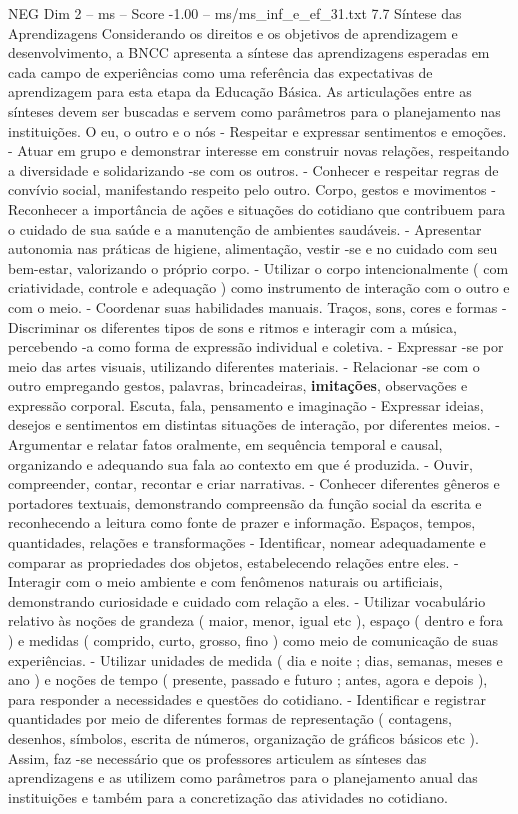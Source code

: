\begin{textsample}{NEG Dim 2 – ms – Score -1.00 – ms/ms\_inf\_e\_ef\_31.txt}  \label{ex:f2_neg_244}
7.7 Síntese das Aprendizagens Considerando os direitos e os objetivos de aprendizagem e desenvolvimento, a BNCC apresenta a síntese das aprendizagens esperadas em cada campo de experiências como uma referência das expectativas de aprendizagem para esta etapa da Educação Básica.
As articulações entre as sínteses devem ser buscadas e servem como parâmetros para o planejamento nas instituições.
O eu, o outro e o nós - Respeitar e expressar sentimentos e emoções. - Atuar em grupo e demonstrar interesse em construir novas relações, respeitando a diversidade e solidarizando -se com os outros. - Conhecer e respeitar regras de convívio social, manifestando respeito pelo outro.
Corpo, gestos e movimentos - Reconhecer a importância de ações e situações do cotidiano que contribuem para o cuidado de sua saúde e a manutenção de ambientes saudáveis. - Apresentar autonomia nas práticas de higiene, alimentação, vestir -se e no cuidado com seu bem-estar, valorizando o próprio corpo. - Utilizar o corpo intencionalmente ( com criatividade, controle e adequação ) como instrumento de interação com o outro e com o meio. - Coordenar suas habilidades manuais.
Traços, sons, cores e formas - Discriminar os diferentes tipos de sons e ritmos e interagir com a música, percebendo -a como forma de expressão individual e coletiva. - Expressar -se por meio das artes visuais, utilizando diferentes materiais. - Relacionar -se com o outro empregando gestos, palavras, brincadeiras, \textbf{imitações}, observações e expressão corporal.
Escuta, fala, pensamento e imaginação - Expressar ideias, desejos e sentimentos em distintas situações de interação, por diferentes meios. - Argumentar e relatar fatos oralmente, em sequência temporal e causal, organizando e adequando sua fala ao contexto em que é produzida. - Ouvir, compreender, contar, recontar e criar narrativas. - Conhecer diferentes gêneros e portadores textuais, demonstrando compreensão da função social da escrita e reconhecendo a leitura como fonte de prazer e informação.
Espaços, tempos, quantidades, relações e transformações - Identificar, nomear adequadamente e comparar as propriedades dos objetos, estabelecendo relações entre eles. - Interagir com o meio ambiente e com fenômenos naturais ou artificiais, demonstrando curiosidade e cuidado com relação a eles. - Utilizar vocabulário relativo às noções de grandeza ( maior, menor, igual etc ), espaço ( dentro e fora ) e medidas ( comprido, curto, grosso, fino ) como meio de comunicação de suas experiências. - Utilizar unidades de medida ( dia e noite ; dias, semanas, meses e ano ) e noções de tempo ( presente, passado e futuro ; antes, agora e depois ), para responder a necessidades e questões do cotidiano. - Identificar e registrar quantidades por meio de diferentes formas de representação ( contagens, desenhos, símbolos, escrita de números, organização de gráficos básicos etc ).
Assim, faz -se necessário que os professores articulem as sínteses das aprendizagens e as utilizem como parâmetros para o planejamento anual das instituições e também para a concretização das atividades no cotidiano.

\end{textsample}
